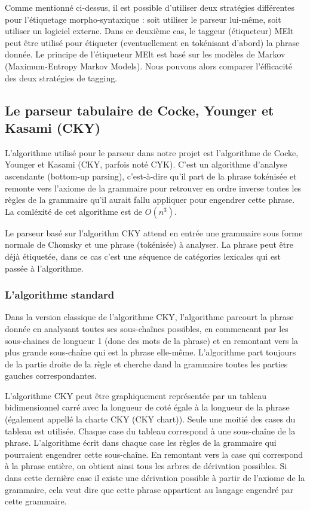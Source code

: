 \documentclass[12pt]{article}
\begin{document}
Comme mentionn\'e ci-dessus, il est possible d'utiliser deux strat\'egies
diff\'erentes pour l'\'etiquetage morpho-syntaxique : soit utiliser le parseur
lui-m\^eme, soit utiliser un logiciel externe. Dans ce deuxi\`eme cas, le taggeur
(\'etiqueteur) MElt \cite{MElt} peut \^etre utilis\'e pour \'etiqueter (eventuellement
en tok\'enisant d'abord) la phrase donn\'ee. Le principe de l'\'etiqueteur MElt est
bas\'e sur les mod\`eles de Markov (Maximum-Entropy Markov Models).
Nous pouvons alors comparer l'\'efficacit\'e des deux strat\'egies de tagging.

\subsection{Le parseur tabulaire de Cocke, Younger et Kasami (CKY)}

L'algorithme utilis\'e pour le parseur dans notre projet est l'algorithme de
Cocke, Younger et Kasami (CKY, parfois not\'e CYK). C'est un algorithme d'analyse
ascendante (bottom-up parsing), c'est-\`a-dire qu'il part de la phrase tok\'enis\'ee
et remonte vers l'axiome de la grammaire pour retrouver en ordre inverse toutes les r\`egles de la grammaire qu'il
aurait fallu appliquer pour engendrer cette phrase. La coml\'exit\'e de cet
algorithme est de $O(n^3)$. \par

Le parseur bas\'e sur l'algorithm CKY attend en entr\'ee une grammaire sous forme
normale de Chomsky et une phrase (tok\'enis\'ee) \`a analyser. La phrase peut \^etre
d\'ej\`a \'etiquet\'ee, dans ce cas c'est une s\'equence de cat\'egories lexicales qui est
pass\'ee \`a l'algorithme.

\subsubsection{L'algorithme standard}
Dans la version classique de l'algorithme CKY, l'algorithme parcourt la phrase
donn\'ee en analysant toutes ses sous-cha\^ines possibles, en commencant par les
sous-chaines de longueur 1 (donc des mots de la phrase) et en remontant vers la
plus grande sous-cha\^ine qui est la phrase elle-m\^eme. L'algorithme
part toujours de la partie droite de la r\`egle et cherche dand la
grammaire toutes les parties gauches correspondantes. \par

L'algorithme CKY peut
\^etre graphiquement repr\'esent\'ee par un tableau bidimensionnel carr\'e avec la longueur de cot\'e \'egale \`a la longueur de la phrase (\'egalement appell\'e la charte CKY (CKY chart)).
Seule une moiti\'e des cases du tableau est utilis\'ee. Chaque case du tableau correspond \`a une sous-cha\^ine de la phrase.
L'algorithme \'ecrit dans chaque case les r\`egles de la grammaire qui pourraient
engendrer cette sous-cha\^ine. En remontant vers la case qui correspond \`a la
phrase enti\`ere, on obtient ainsi tous les arbres de d\'erivation possibles. Si
dans cette derni\`ere case il existe une d\'erivation possible \`a partir de l'axiome
de la grammaire, cela veut dire que cette phrase appartient au langage engendr\'e
par cette grammaire.\par
\end{document}
